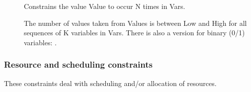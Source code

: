 \begin{description}
\item[]
Constrains the value Value to occur N times in Vars.

\item[]
The number of values taken from Values is between Low and
High for all sequences of K variables in Vars. There is also a version for
binary (0/1) variables:
.
\end{description}

\subsubsection{Resource and scheduling constraints}
These constraints deal with scheduling and/or allocation of resources.

